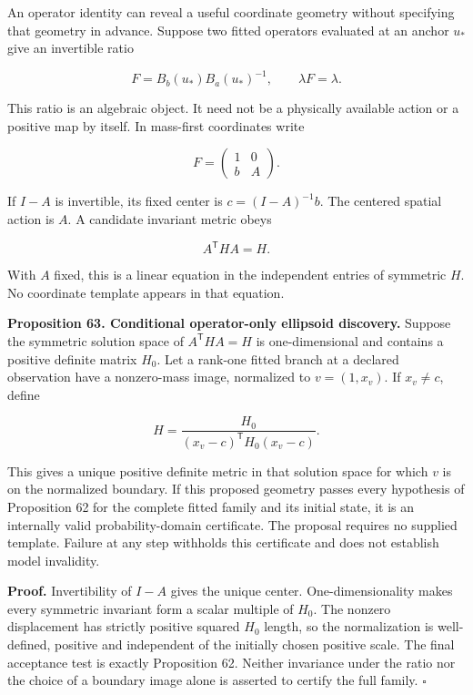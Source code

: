 \documentclass[11pt,letterpaper]{article}
\begin{document}
An operator identity can reveal a useful coordinate geometry without
specifying that geometry in advance. Suppose two fitted operators
evaluated at an anchor \(u_*\) give an invertible ratio

\[
F=B_b(u_*)B_a(u_*)^{-1},\qquad \lambda F=\lambda.
\]

This ratio is an algebraic object. It need not be a physically available
action or a positive map by itself. In mass-first coordinates write

\[
F=\begin{pmatrix}1&0\\b&A\end{pmatrix}.
\]

If \(I-A\) is invertible, its fixed center is \(c=(I-A)^{-1}b\). The
centered spatial action is \(A\). A candidate invariant metric obeys

\[
A^{\mathsf T}HA=H.
\]

With \(A\) fixed, this is a linear equation in the independent entries
of symmetric \(H\). No coordinate template appears in that equation.

\textbf{Proposition 63. Conditional operator-only ellipsoid discovery.}
Suppose the symmetric solution space of \(A^{\mathsf T}HA=H\) is
one-dimensional and contains a positive definite matrix \(H_0\). Let a
rank-one fitted branch at a declared observation have a nonzero-mass
image, normalized to \(v=(1,x_v)\). If \(x_v\neq c\), define

\[
H=\frac{H_0}{(x_v-c)^{\mathsf T}H_0(x_v-c)}.
\]

This gives a unique positive definite metric in that solution space for
which \(v\) is on the normalized boundary. If this proposed geometry
passes every hypothesis of Proposition 62 for the complete fitted family
and its initial state, it is an internally valid probability-domain
certificate. The proposal requires no supplied template. Failure at any
step withholds this certificate and does not establish model invalidity.

\textbf{Proof.} Invertibility of \(I-A\) gives the unique center.
One-dimensionality makes every symmetric invariant form a scalar
multiple of \(H_0\). The nonzero displacement has strictly positive
squared \(H_0\) length, so the normalization is well-defined, positive
and independent of the initially chosen positive scale. The final
acceptance test is exactly Proposition 62. Neither invariance under the
ratio nor the choice of a boundary image alone is asserted to certify
the full family. \(\square\)
\end{document}
